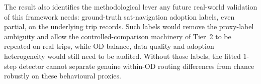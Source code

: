 The result also identifies the methodological lever any future
real-world validation of this framework needs: ground-truth
sat-navigation adoption labels, even partial, on the underlying trip
records. Such labels would remove the proxy-label ambiguity and allow the
controlled-comparison machinery of Tier~2 to be repeated on real trips,
while OD balance, data quality and adoption heterogeneity would still need
to be audited. Without those labels, the fitted $1$-step
detector cannot separate genuine within-OD routing differences from chance
robustly on these behavioural proxies.
